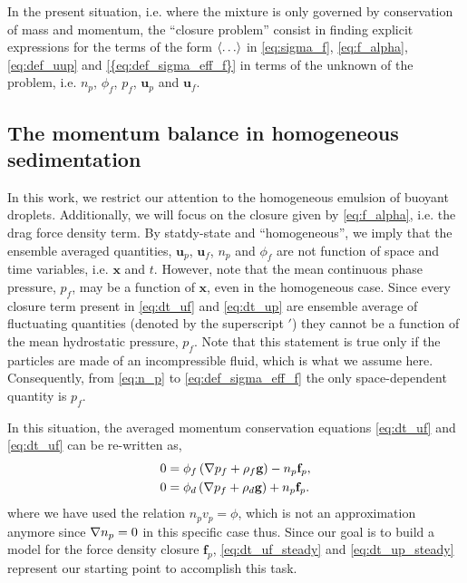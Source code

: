In the present situation, i.e. where the mixture is only governed by conservation of mass and momentum,  the ``closure problem'' consist in finding explicit expressions for the terms of the form $\left<\ldots\right>$ in \ref{eq:sigma_f}, \ref{eq:f_alpha}, \ref{eq:def_uup} and \ref{{eq:def_sigma_eff_f}} in terms of the unknown of the problem, i.e. $n_p$, $\phi_f$, $p_f$, $\textbf{u}_p$ and $\textbf{u}_f$. 



\subsection{ The momentum balance in homogeneous sedimentation}

In this work, we restrict our attention to the homogeneous emulsion of buoyant droplets. 
Additionally, we will focus on the closure given by \ref{eq:f_alpha}, i.e. the drag force density term. 
By statdy-state and ``homogeneous'', we imply that the ensemble averaged quantities, $\textbf{u}_p$, $\textbf{u}_f$, $n_p$ and $\phi_f$ are not function of space and time variables, i.e. $\textbf{x}$ and $t$. 
However, note that the mean continuous phase pressure, $p_f$, may be a function of $\textbf{x}$, even in the homogeneous case. 
Since every closure term present in \ref{eq:dt_uf} and \ref{eq:dt_up} are ensemble average of fluctuating quantities (denoted by the superscript $'$) they cannot be a function of the mean hydrostatic pressure, $p_f$.
Note that this statement is true only if the particles are made of an incompressible fluid, which is what we assume here. 
Consequently, from \ref{eq:n_p} to \ref{eq:def_sigma_eff_f} the only space-dependent quantity is $p_f$. 

In this situation, the averaged momentum conservation equations \ref{eq:dt_uf} and \ref{eq:dt_uf} can be re-written as, 
\begin{align}
    0 
    &= \phi_f 
    \left(\grad p_f
    + \rho_f \textbf{g}\right)
    - n_p \textbf{f}_p, 
    \label{eq:dt_uf_steady}
    \\
    0
    &= 
    \phi_d \left(\grad p_f
    + \rho_d \textbf{g}\right)
    + n_p \textbf{f}_p. 
    \label{eq:dt_up_steady}
\end{align}
where we have used the relation $n_p v_p = \phi$, which is not an approximation anymore since $\mathbf{\nabla} n_p = 0$ in this specific case thus.
Since our goal is to build a model for the force density closure $\textbf{f}_p$, \ref{eq:dt_uf_steady} and \ref{eq:dt_up_steady} represent our starting point to accomplish this task. 




